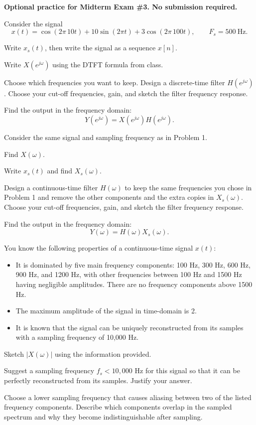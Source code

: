 \documentclass{ee102_pset}
\author{\rule{3cm}{0.4pt}}
\begin{document}
\textbf{Optional practice for Midterm Exam \#3. No submission required.}


Consider the signal
\[
x(t)=\cos(2\pi\,10t)+10\sin(2\pi t)+3\cos(2\pi\,100t),
\qquad F_s=500\ \mathrm{Hz}.
\]

\problempart[5 points] Write $x_s(t)$, then write the signal as a sequence $x[n]$.

\problempart[10 points] Write $X(e^{j\omega})$ using the DTFT formula from class.

\problempart[10 points] Choose which frequencies you want to keep. Design a discrete-time
filter $H(e^{j\omega})$. Choose your cut-off frequencies, gain, and sketch the
filter frequency response.

\problempart[10 points] Find the output in the frequency domain:
\[
Y(e^{j\omega})=X(e^{j\omega})H(e^{j\omega}).
\]


Consider the same signal and sampling frequency as in Problem 1.

\problempart[5 points] Find $X(\omega)$.

\problempart[10 points] Write $x_s(t)$ and find $X_s(\omega)$.

\problempart[10 points] Design a continuous-time filter $H(\omega)$ to keep the same
frequencies you chose in Problem 1 and remove the other components and
the extra copies in $X_s(\omega)$. Choose your cut-off frequencies, gain,
and sketch the filter frequency response.

\problempart[10 points] Find the output in the frequency domain:
\[
Y(\omega)=H(\omega)X_s(\omega).
\]


You know the following properties of a continuous-time signal $x(t)$:
\begin{itemize}
    \item It is dominated by five main frequency components: 100 Hz, 300 Hz,
    600 Hz, 900 Hz, and 1200 Hz, with other frequencies between 100 Hz and
    1500 Hz having negligible amplitudes. There are no frequency components
    above 1500 Hz.
    \item The maximum amplitude of the signal in time-domain is 2.
    \item It is known that the signal can be uniquely reconstructed from its
    samples with a sampling frequency of 10,000 Hz.
\end{itemize}

\problempart[5 points] Sketch $|X(\omega)|$ using the information provided.

\problempart[10 points] Suggest a sampling frequency $f_s<10{,}000$ Hz for this signal
so that it can be perfectly reconstructed from its samples. Justify your answer.

\problempart[15 points] Choose a lower sampling frequency that causes aliasing between
two of the listed frequency components. Describe which components overlap
in the sampled spectrum and why they become indistinguishable after sampling.
\end{document}
